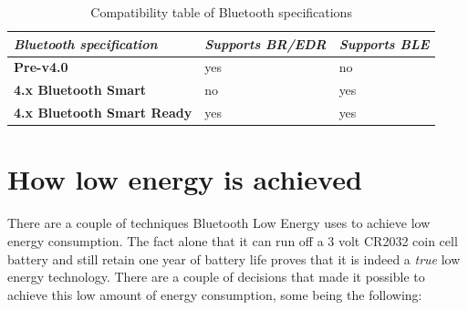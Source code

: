 \documentclass[pdftex,a4paper,12pt,twoside]{report}
\begin{document}
\begin{table}[]
\centering
\caption[Compatibility table of Bluetooth specifications]{Compatibility table of Bluetooth specifications \citep{Townsend2014}}
\label{table:configurations}
\begin{tabular}{|l|l|l|}
\hline
\textit{\textbf{Bluetooth specification}} & \textit{\textbf{Supports BR/EDR}} & \textit{\textbf{Supports BLE}} \\ \hline
\textbf{Pre-v4.0}                   & yes                                 & no                              \\ \hline
\textbf{4.x Bluetooth Smart}        & no                                  & yes                              \\ \hline
\textbf{4.x Bluetooth Smart Ready}  & yes                                 & yes                              \\ \hline
\end{tabular}
\end{table}

\section{How low energy is achieved}
\label{sec:lowenergy}
There are a couple of techniques Bluetooth Low Energy uses to achieve low energy consumption. The fact alone that it can run off a 3 volt CR2032 coin cell battery and still retain one year of battery life \citep{kamath2010measuring} proves that it is indeed a \textit{true} low energy technology. There are a couple of decisions that made it possible to achieve this low amount of energy consumption, some being the following:
\end{document}
